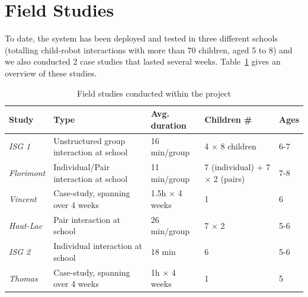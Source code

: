 \documentclass{article}
\begin{document}
\section{Field Studies}

To date, the system has been deployed and tested in three different
schools (totalling child-robot interactions with more than 70 children, aged 5
to 8) and we also conducted 2 case studies that lasted several weeks.
Table~\ref{studies} gives an overview of these studies.

\begin{table}[ht!]
\centering
\caption{\small Field studies conducted within the project}
\label{studies}
\footnotesize
\begin{tabular}{@{}lp{4cm}p{2.2cm}p{2cm}l@{}}
\toprule
{\bf Study}     & {\bf Type}                                    & {\bf Avg. duration}              & {\bf Children \#}                     & {\bf Ages} \\ \midrule
{\it ISG 1}     & Unstructured group interaction at school      & 16 min/group               & 4 $\times$ 8 children                 & 6-7        \\
{\it Florimont} & Individual/Pair interaction at school         & 11 min/group               & 7 (individual) + 7 $\times$ 2 (pairs) & 7-8        \\
{\it Vincent}     & Case-study, spanning over 4 weeks              & 1.5h $\times$ 4 weeks & 1                                     & 6          \\
{\it Haut-Lac}  & Pair interaction at school & 26 min/group                            & 7 $\times$ 2                          & 5-6        \\
{\it ISG 2}     & Individual interaction at school              & 18 min                            & 6                                     & 5-6        \\
{\it Thomas}     & Case-study, spanning over 4 weeks              & 1h $\times$ 4 weeks        & 1                                     & 5          \\ \bottomrule
\end{tabular}
\end{table}

\end{document}
